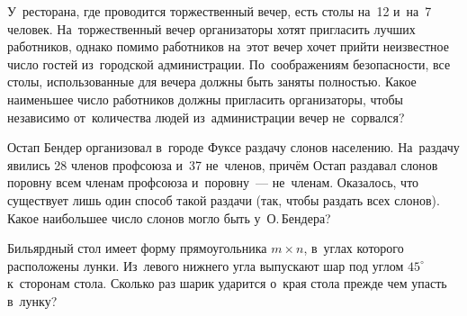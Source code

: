 \begin{problems}
\item
У~ресторана, где проводится торжественный вечер, есть столы на~12
и~на~7 человек.
На~торжественный вечер организаторы хотят пригласить лучших работников, однако
помимо работников на~этот вечер хочет прийти неизвестное число гостей
из~городской администрации.
По~соображениям безопасности, все столы, использованные для вечера должны быть
заняты полностью.
Какое наименьшее число работников должны пригласить организаторы, чтобы
независимо от~количества людей из~администрации вечер не~сорвался?

\item
Остап Бендер организовал в~городе Фуксе раздачу слонов населению.
На~раздачу явились 28 членов профсоюза и~37 не~членов, причём Остап раздавал
слонов поровну всем членам профсоюза и~поровну~--- не~членам.
Оказалось, что существует лишь один способ такой раздачи (так, чтобы раздать
всех слонов).
Какое наибольшее число слонов могло быть у~О.\,Бендера?

\item
Бильярдный стол имеет форму прямоугольника $m \times n$, в~углах которого
расположены лунки.
Из~левого нижнего угла выпускают шар под углом $45^\circ$ к~сторонам стола.
Сколько раз шарик ударится о~края стола прежде чем упасть в~лунку?

\end{problems}

\endgroup %

